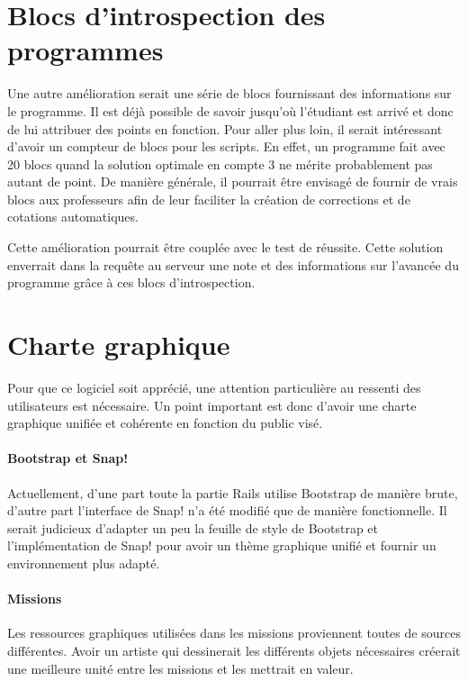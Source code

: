 \section{Blocs d'introspection des programmes}
Une autre amélioration serait une série de blocs fournissant des informations sur le programme. Il est déjà possible de savoir jusqu'où l'étudiant est arrivé et donc de lui attribuer des points en fonction. 
Pour aller plus loin, il serait intéressant d'avoir un compteur de blocs pour les scripts. En effet, un programme fait avec 20 blocs quand la solution optimale en compte 3 ne mérite probablement pas autant de point.
De manière générale, il pourrait être envisagé de fournir de vrais blocs aux professeurs afin de leur faciliter la création de corrections et de cotations automatiques.

Cette amélioration pourrait être couplée avec le test de réussite. Cette solution enverrait dans la requête au serveur une note et des informations sur l'avancée du programme grâce à ces blocs d'introspection.

\section{Charte graphique}
Pour que ce logiciel soit apprécié, une attention particulière au ressenti des utilisateurs est nécessaire. Un point important est donc d'avoir une charte graphique unifiée et cohérente en fonction du public visé.

\paragraph{Bootstrap et Snap!}
Actuellement, d'une part toute la partie Rails utilise Bootstrap de manière brute, d'autre part l'interface de Snap! n'a été modifié que de manière fonctionnelle. Il serait judicieux d'adapter un peu la feuille de style de Bootstrap et l'implémentation de Snap! pour avoir un thème graphique unifié et fournir un environnement plus adapté.

\paragraph{Missions}
Les ressources graphiques utilisées dans les missions proviennent toutes de sources différentes. Avoir un artiste qui dessinerait les différents objets nécessaires créerait une meilleure unité entre les missions et les mettrait en valeur.


% 
% 
% 
% 
% 
% 
